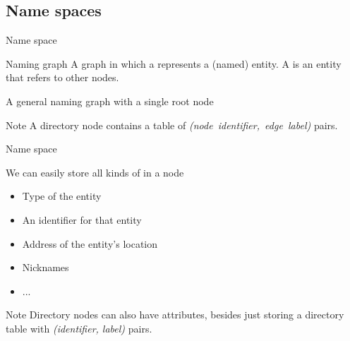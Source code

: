 \subsection{Name spaces}
\begin{slide}{Name space}
  \vspace*{-6pt}
  \begin{block}{Naming graph} 
    A graph in which a  represents a (named) entity. A  is an entity that
    refers to other nodes.
  \end{block}
  \begin{block}{A general naming graph with a single root node}
    \begin{center}
    \end{center}
  \end{block}
  \begin{block}{Note} 
    A directory node contains a table of \emph{(node~identifier,~edge~label)} pairs. 
  \end{block}
\end{slide}
\begin{slide}{Name space}
  \begin{block}{We can easily store all kinds of  in a node}
    \begin{itemize}\tightlist
    \item Type of the entity
    \item An identifier for that entity
    \item Address of the entity's location
    \item Nicknames
    \item ...
    \end{itemize}
  \end{block}
  \begin{alertblock}{Note}
    Directory nodes can also have attributes, besides just storing a directory table with \emph{(identifier,
      label)} pairs.
  \end{alertblock}
\end{slide}

